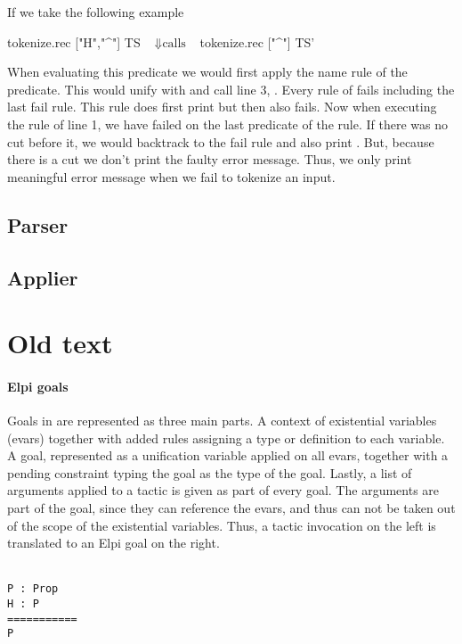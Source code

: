 \documentclass[thesis.tex]{subfiles}
\begin{document}
{{{If we take the following example
\begin{elpicode}
  tokenize.rec ["H","^"] TS
              ~$\Downarrow \text{calls}$~ 
  tokenize.rec ["^"] TS'
\end{elpicode}
When evaluating this predicate we would first apply the name rule of the  predicate. This would unify  with \elpiinline{[tName "H" | TS']} and call line 3, . Every rule of  fails including the last fail rule. This rule does first print  but then also fails. Now when executing the rule of line 1, we have failed on the last predicate of the rule. If there was no cut before it, we would backtrack to the fail rule and also print . But, because there is a cut we don't print the faulty error message. Thus, we only print meaningful error message when we fail to tokenize an input.

\subsection{Parser}\label{ssec:parser}


\subsection{Applier}\label{ssec:applier}

\section{Old text}

\paragraph*{Elpi goals}
Goals in \ce are represented as three main parts. A context of existential variables (evars) together with added rules assigning a type or definition to each variable. A goal, represented as a unification variable applied on all evars, together with a pending constraint typing the goal as the type of the goal. Lastly, a list of arguments applied to a tactic is given as part of every goal. The arguments are part of the goal, since they can reference the evars, and thus can not be taken out of the scope of the existential variables. Thus, a tactic invocation on the left is translated to an Elpi goal on the right.
\\\\
\begin{minipage}[t]{0.2\linewidth}
  \begin{verbatim}
P : Prop
H : P
===========
P


\end{verbatim}
\end{minipage}}}}
\end{document}
